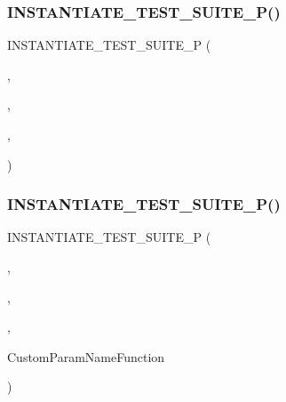 \subsubsection{\texorpdfstring{INSTANTIATE\_TEST\_SUITE\_P()}{INSTANTIATE\_TEST\_SUITE\_P()}\hspace{0.1cm}{\footnotesize\ttfamily [12/20]}}
{\footnotesize\ttfamily I\+N\+S\+T\+A\+N\+T\+I\+A\+T\+E\+\_\+\+T\+E\+S\+T\+\_\+\+S\+U\+I\+T\+E\+\_\+P (\begin{DoxyParamCaption}\item[{\mbox{\hyperlink{_obj__test_2lib_2googletest-release-1_88_81_2googletest_2test_2googletest-param-test-test_8cc_a016a6f23e3fe3de5183e5493cf4bcc4f}{Custom\+Param\+Name\+Function}}}]{,  }\item[{\mbox{\hyperlink{class_custom_function_naming_test}{Custom\+Function\+Naming\+Test}}}]{,  }\item[{Values(std\+::string(\char`\"{}Function\+Name\char`\"{}))}]{,  }\item[{\mbox{\hyperlink{_obj__test_2lib_2googletest-release-1_88_81_2googletest_2test_2googletest-param-test-test_8cc_a016a6f23e3fe3de5183e5493cf4bcc4f}{Custom\+Param\+Name\+Function}}}]{ }\end{DoxyParamCaption})}

\mbox{\label{_obj__test_2lib_2googletest-master_2googletest_2test_2googletest-param-test-test_8cc_a1a12716f19b207a803949487ced6f798}} 
\subsubsection{\texorpdfstring{INSTANTIATE\_TEST\_SUITE\_P()}{INSTANTIATE\_TEST\_SUITE\_P()}\hspace{0.1cm}{\footnotesize\ttfamily [13/20]}}
{\footnotesize\ttfamily I\+N\+S\+T\+A\+N\+T\+I\+A\+T\+E\+\_\+\+T\+E\+S\+T\+\_\+\+S\+U\+I\+T\+E\+\_\+P (\begin{DoxyParamCaption}\item[{Custom\+Param\+Name\+FunctionP}]{,  }\item[{\mbox{\hyperlink{class_custom_function_naming_test}{Custom\+Function\+Naming\+Test}}}]{,  }\item[{Values(std\+::string(\char`\"{}Function\+NameP\char`\"{}))}]{,  }\item[{\&}]{Custom\+Param\+Name\+Function }\end{DoxyParamCaption})}

